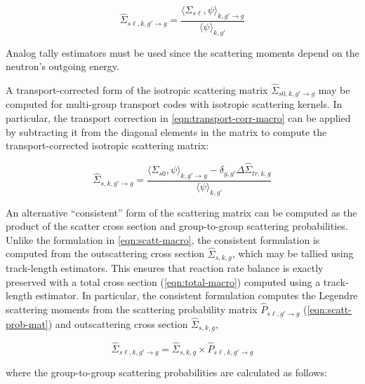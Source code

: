 \begin{equation}
\label{eqn:scatt-macro}
\hat{\Sigma}_{s\ell,k,g'\rightarrow g} = \frac{\langle \Sigma_{s\ell}, \psi \rangle_{k,g'\rightarrow g}}{\langle \psi \rangle_{k,g'}}
\end{equation}

\noindent Analog tally estimators must be used since the scattering moments depend on the neutron's outgoing energy.

A transport-corrected form of the isotropic scattering matrix $\hat{\Sigma}_{s0,k,g'\rightarrow g}$ may be computed for multi-group transport codes with isotropic scattering kernels. In particular, the transport correction in \cref{eqn:transport-corr-macro} can be applied by subtracting it from the diagonal elements in the matrix to compute the transport-corrected isotropic scattering matrix:

\begin{equation}
\label{eqn:scatt-trans-macro}
\hat{\Sigma}_{s,k,g'\rightarrow g} = \frac{\langle \Sigma_{s0}, \psi \rangle_{k,g'\rightarrow g} - \delta_{g,g'} \Delta\hat{\Sigma}_{tr,k,g}}{\langle \psi \rangle_{k,g'}}
\end{equation}


An alternative ``consistent'' form of the scattering matrix can be computed as the product of the scatter cross section and group-to-group scattering probabilities. Unlike the formulation in \cref{eqn:scatt-macro}, the consistent formulation is computed from the outscattering cross section $\hat{\Sigma}_{s,k,g}$, which may be tallied using track-length estimators. This ensures that reaction rate balance is exactly preserved with a total cross section (\cref{eqn:total-macro}) computed using a track-length estimator. In particular, the consistent formulation computes the Legendre scattering moments from the scattering probability matrix $\hat{P}_{s\ell,g'\rightarrow g}$ (\cref{eqn:scatt-prob-mat}) and outscattering cross section $\hat{\Sigma}_{s,k,g}$,

\begin{equation}
\label{eqn:scatt-mat-consistent}
\hat{\Sigma}_{s\ell,k,g'\rightarrow g} = \hat{\Sigma}_{s,k,g} \times \hat{P}_{s\ell,k,g'\rightarrow g}
\end{equation}

\noindent where the group-to-group scattering probabilities are calculated as follows:

